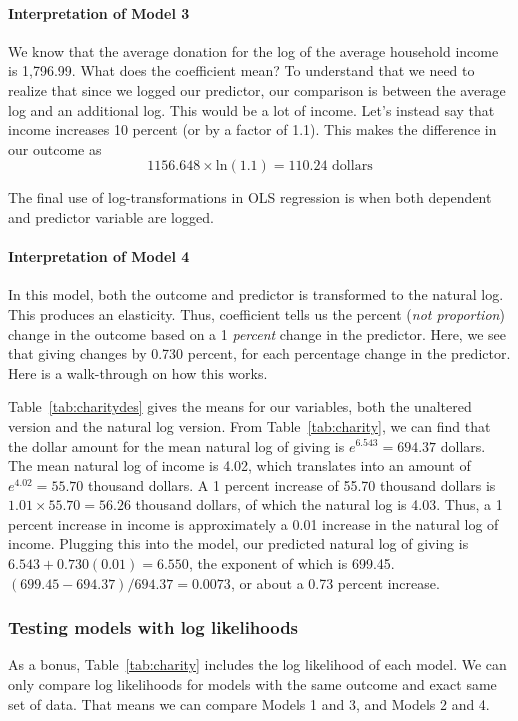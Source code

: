 \paragraph{Interpretation of Model 3}

We know that the average donation for the log of the average household income is 1,796.99. What does the coefficient mean? To understand that we need to realize that since we logged our predictor, our comparison is between the average log and an additional log. This would be a lot of income. Let's instead say that income increases 10 percent (or by a factor of 1.1). This makes the difference in our outcome as
\[
1156.648\times\mbox{ln}\left(1.1\right)=110.24 \mbox{ dollars}
\]

The final use of log-transformations in OLS regression is when both dependent and predictor variable are logged.

\paragraph{Interpretation of Model 4}

In this model, both the outcome and predictor is transformed to the natural log. This produces an elasticity. Thus, coefficient tells us the percent ({\it not proportion}) change in the outcome based on a 1 {\it percent} change in the predictor. Here, we see that giving changes by 0.730 percent, for each percentage change in the predictor. Here is a walk-through on how this works.

Table~\ref{tab:charitydes} gives the means for our variables, both the unaltered version and the natural log version. From Table~\ref{tab:charity}, we can find that the dollar amount for the mean natural log of giving is $e^{6.543}=694.37$ dollars. The mean natural log of income is 4.02, which translates into an amount of $e^{4.02}=55.70$ thousand dollars. A 1 percent increase of 55.70 thousand dollars is $1.01\times55.70 = 56.26$ thousand dollars, of which the natural log is 4.03. Thus, a 1 percent increase in income is approximately a 0.01 increase in the natural log of income. Plugging this into the model, our predicted natural log of giving is $6.543+0.730\left(0.01\right)=6.550$, the exponent of which is 699.45. $\left(699.45 - 694.37\right)/694.37=0.0073$, or about a 0.73 percent increase.

\subsubsection{Testing models with log likelihoods}
\label{sec:likelihoodtest}
As a bonus, Table~\ref{tab:charity} includes the log likelihood of each model. We can only compare log likelihoods for models with the same outcome and exact same set of data. That means we can compare Models 1 and 3, and Models 2 and 4.

